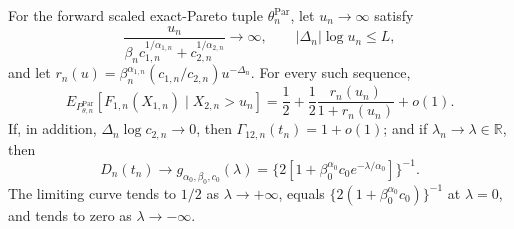 For the forward scaled exact-Pareto tuple \(\theta_n^{\mathrm{Par}}\), let \(u_n\to\infty\) satisfy
\[
\frac{u_n}{\beta_n c_{1,n}^{1/\alpha_{1,n}}+c_{2,n}^{1/\alpha_{2,n}}}\to\infty,
\qquad |\Delta_n|\log u_n\leq L,
\]
and let \(r_n(u)=\beta_n^{\alpha_{1,n}}(c_{1,n}/c_{2,n})u^{-\Delta_n}\). For every such sequence,
\[
E_{P_{\theta,n}^{\mathrm{Par}}}[F_{1,n}(X_{1,n})\mid X_{2,n}>u_n]
=\frac12+\frac12\frac{r_n(u_n)}{1+r_n(u_n)}+o(1).
\]
If, in addition, \(\Delta_n\log c_{2,n}\to0\), then \(\Gamma_{12,n}(t_n)=1+o(1)\); and if \(\lambda_n\to\lambda\in\mathbb R\), then
\[
D_n(t_n)\to g_{\alpha_0,\beta_0,c_0}(\lambda)
=\{2[1+\beta_0^{\alpha_0}c_0e^{-\lambda/\alpha_0}]\}^{-1}.
\]
The limiting curve tends to \(1/2\) as \(\lambda\to+\infty\), equals \(\{2(1+\beta_0^{\alpha_0}c_0)\}^{-1}\) at \(\lambda=0\), and tends to zero as \(\lambda\to-\infty\).